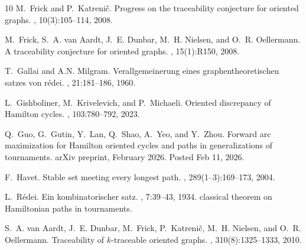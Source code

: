 \documentclass{article}
\newcommand{\2}{\vspace{2mm}}
\theoremstyle{definition}
\begin{document}
\begin{thebibliography}{10}
M.~Frick and P.~Katreni{\v{c}}.
\newblock Progress on the traceability conjecture for oriented graphs.
,
  10(3):105--114, 2008.

M.~Frick, S.~A. van Aardt, J.~E. Dunbar, M.~H. Nielsen, and O.~R. Oellermann.
\newblock A traceability conjecture for oriented graphs.
, 15(1):R150, 2008.

T.~Gallai and A.N. Milgram.
\newblock Verallgemeinerung eines graphentheoretischen satzes von r{\'e}dei.
, 21:181--186, 1960.

L.~Gishboliner, M.~Krivelevich, and P.~Michaeli.
\newblock Oriented discrepancy of {H}amilton cycles.
, 103:780--792, 2023.

Q.~Guo, G.~Gutin, Y.~Lan, Q.~Shao, A.~Yeo, and Y.~Zhou.
\newblock Forward arc maximization for {H}amilton oriented cycles and paths in
  generalizations of tournaments.
\newblock arXiv preprint, February 2026.
\newblock Posted Feb 11, 2026.

F.~Havet.
\newblock Stable set meeting every longest path.
, 289(1--3):169--173, 2004.

L.~R{\'e}dei.
\newblock Ein kombinatorischer satz.
, 7:39--43, 1934.
\newblock classical theorem on Hamiltonian paths in tournaments.

S.~A. van Aardt, J.~E. Dunbar, M.~Frick, P.~Katreni{\v{c}}, M.~H. Nielsen, and
  O.~R. Oellermann.
\newblock Traceability of $k$-traceable oriented graphs.
, 310(8):1325--1333, 2010.

\end{thebibliography}
\end{document}
